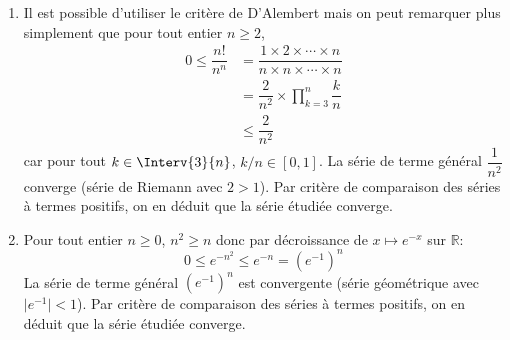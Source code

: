 \documentclass[a4paper,10pt]{report}
\begin{document}
\begin{enumerate}
\item Il est possible d'utiliser le critère de D'Alembert mais on peut remarquer plus simplement que pour tout entier $n \geq 2$,
\begin{align*}
 0 \leq \dfrac{n!}{n^n} & = \dfrac{1 \times 2 \times \cdots \times n}{n \times n \times \cdots \times n} \\
 & = \dfrac{2}{n^2} \times \prod_{k=3}^n \dfrac{k}{n} \\
 & \leq \dfrac{2}{n^2}
 \end{align*}
car pour tout $k \in \Interv{3}{n}$, $k/n \in [0,1]$. La série de terme général $\dfrac{1}{n^2}$ converge (série de Riemann avec $2>1$). Par critère de comparaison des séries à termes positifs, on en déduit que la série étudiée converge.
\item Pour tout entier $n \geq 0$, $n^2 \geq n$ donc par décroissance de $x \mapsto e^{-x}$ sur $\mathbb{R}$:
$$ 0 \leq e^{-n^2} \leq e^{-n} = (e^{-1})^n$$
La série de terme général $(e^{-1})^n$ est convergente (série géométrique avec $\vert e^{-1}\vert <1$). Par critère de comparaison des séries à termes positifs, on en déduit que la série étudiée converge.

\medskip


\end{enumerate}
\end{document}
